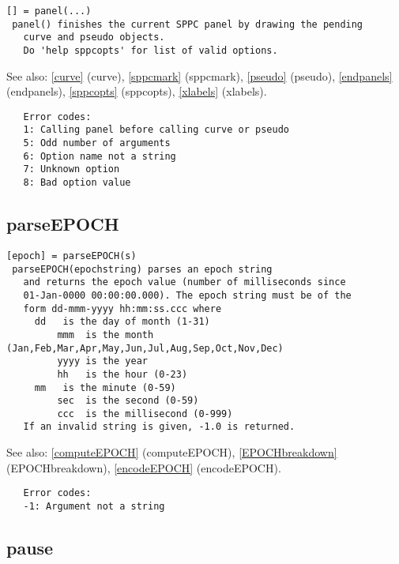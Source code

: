 \documentclass[a4paper]{article}
\begin{document}
\begin{tscreen}
\begin{verbatim}
[] = panel(...)
 panel() finishes the current SPPC panel by drawing the pending
   curve and pseudo objects.
   Do 'help sppcopts' for list of valid options.
\end{verbatim}

See also: \ref{curve} {(curve)}, \ref{sppcmark} {(sppcmark)}, \ref{pseudo} {(pseudo)}, \ref{endpanels} {(endpanels)}, \ref{sppcopts} {(sppcopts)}, \ref{xlabels} {(xlabels)}.
\begin{verbatim}
   Error codes:
   1: Calling panel before calling curve or pseudo
   5: Odd number of arguments
   6: Option name not a string
   7: Unknown option
   8: Bad option value
\end{verbatim}
\end{tscreen}





\subsection{parseEPOCH\label{parseEPOCH}}

\begin{tscreen}
\begin{verbatim}
[epoch] = parseEPOCH(s)
 parseEPOCH(epochstring) parses an epoch string
   and returns the epoch value (number of milliseconds since
   01-Jan-0000 00:00:00.000). The epoch string must be of the
   form dd-mmm-yyyy hh:mm:ss.ccc where
     dd   is the day of month (1-31)
         mmm  is the month (Jan,Feb,Mar,Apr,May,Jun,Jul,Aug,Sep,Oct,Nov,Dec)
         yyyy is the year
         hh   is the hour (0-23)
     mm   is the minute (0-59)
         sec  is the second (0-59)
         ccc  is the millisecond (0-999)
   If an invalid string is given, -1.0 is returned.
\end{verbatim}

See also: \ref{computeEPOCH} {(computeEPOCH)}, \ref{EPOCHbreakdown} {(EPOCHbreakdown)}, \ref{encodeEPOCH} {(encodeEPOCH)}.
\begin{verbatim}
   Error codes:
   -1: Argument not a string
\end{verbatim}
\end{tscreen}





\subsection{pause\label{pause}}
\end{document}

